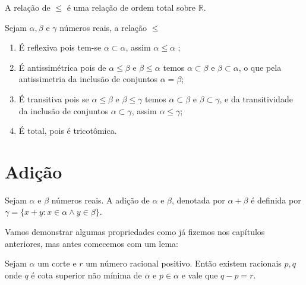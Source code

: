 \documentclass[../main.tex]{subfiles}
\begin{document}
\begin{teo}\label{reais-teo-ordemTotal}
    A relação de $\leq$ é uma relação de ordem total sobre $\mathbb{R}$.
\end{teo}
\begin{dem}
    Sejam $\alpha, \beta$ e $\gamma$ números reais, a relação $\leq$
    \begin{enumerate}[label=(\roman*)]
        \item É reflexiva pois tem-se $\alpha \subset \alpha$, assim $\alpha \leq \alpha$ ;
        \item É antissimétrica pois de $\alpha \leq \beta$ e $\beta \leq \alpha$ temos $\alpha \subset \beta$ e $\beta \subset \alpha$, o que pela antissimetria da inclusão de conjuntos $\alpha = \beta$;
        \item É transitiva pois se $\alpha \leq \beta$ e $\beta \leq \gamma$ temos $\alpha \subset \beta$ e $\beta \subset \gamma$, e da transitividade da inclusão de conjuntos $\alpha \subset \gamma$, assim $\alpha \leq \gamma$;
        \item É total, pois é tricotômica.
    \end{enumerate}
\end{dem}

\section{Adição}
\begin{defi}\label{reais-def-adicao}
    Sejam $\alpha$ e $\beta$ números reais. A adição de $\alpha$ e $\beta$, denotada por $\alpha + \beta$ é definida por $\gamma = \{ x + y : x \in \alpha \land y \in \beta \}$.
\end{defi}

Vamos demonstrar algumas propriedades como já fizemos nos capítulos anteriores, mas antes comecemos com um lema:

\begin{lema}\label{reais-lema-pqNaoMinimo}
    Sejam $\alpha$ um corte e $r$ um número racional positivo. Então existem racionais $p,q$ onde $q$ é cota superior não mínima de $\alpha$ e $p \in \alpha$ e vale que $q-p = r$.
\end{lema}
\begin{dem}
\end{dem}
\end{document}
